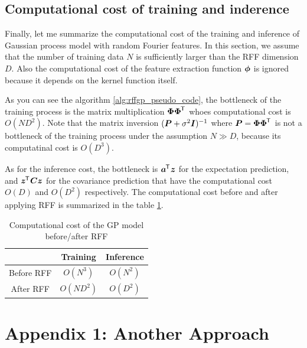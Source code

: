 \documentclass[twocolumn,a4paper,10pt]{article}
\begin{document}
\subsection{Computational cost of training and inderence}

Finally, let me summarize the computational cost of the training and inference of Gaussian process
model with random Fourier features. In this section, we assume that the number of training data $N$
is sufficiently larger than the RFF dimension $D$. Also the computational cost of the feature
extraction function $\boldsymbol{\phi}$ is ignored because it depends on the kernel function itself.  

As you can see the algorithm \ref{alg:rffgp_pseudo_code}, the bottleneck of the training process is
the matrix multiplication $\boldsymbol{\Phi} \boldsymbol{\Phi}^{\mkern-1.5mu\mathsf{T}}\hspace{0.5pt}$ whoes computational cost is $O(N D^2)$.
Note that the matrix inversion $(\boldsymbol{P} + \sigma^2 \boldsymbol{I})^{-1}$ where
$\boldsymbol{P} = \boldsymbol{\Phi}\boldsymbol{\Phi}^{\mkern-1.5mu\mathsf{T}}\hspace{0.5pt}$ is not a bottleneck of the training process under
the assumption $N \gg D$, because its computatinal cost is $O(D^3)$.

As for the inference cost, the bottleneck is $\boldsymbol{a}^{\mkern-1.5mu\mathsf{T}}\hspace{0.5pt} \boldsymbol{z}$ for the expectation prediction,
and $\boldsymbol{z}^{\mkern-1.5mu\mathsf{T}}\hspace{0.5pt} \boldsymbol{C} \boldsymbol{z}$ for the covariance prediction that have the 
computational cost $O(D)$ and $O(D^2)$ respectively. The computational cost before and after
applying RFF is summarized in the table \ref{tab:gp_complexity}.

\begin{table}[h]
    \caption{Computational cost of the GP model before/after RFF}
    \label{tab:gp_complexity}
    \begin{center}\begin{tabular}{ccc}
        \hline
         & Training & Inference \\
        \hline
        Before RFF & $O(N^3)$   & $O(N^2)$ \\  
        After RFF  & $O(N D^2)$ & $O(D^2)$ \\
        \hline
    \end{tabular}\end{center}
\end{table}


\newpage
\appendix

\section{Appendix 1: Another Approach}\titlebar
\end{document}

